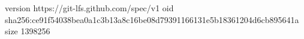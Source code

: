 version https://git-lfs.github.com/spec/v1
oid sha256:ce91f54038bea0a1c3b13a8c16be08d79391166131e5b18361204d6cb895641a
size 1398256
